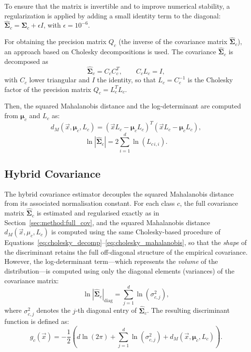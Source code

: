 To ensure that the matrix is invertible and to improve numerical stability, a regularization is applied by adding a small identity term to the diagonal: $\hat{\boldsymbol{\Sigma}}_c = \boldsymbol{\Sigma}_c + \epsilon I$, with $\epsilon = 10^{-6}$.

For obtaining the precision matrix $Q_c$ (the inverse of the covariance matrix $\hat{\boldsymbol{\Sigma}}_c$), an approach based on Cholesky decompositions is used. The covariance $\hat{\boldsymbol{\Sigma}}_c$ is decomposed as
\begin{equation}
	\hat{\boldsymbol{\Sigma}}_c = C_c C_c^T, \qquad C_c L_c = I,
	\label{eq:cholesky_decomp}
\end{equation}
with $C_c$ lower triangular and $I$ the identity, so that $L_c = C_c^{-1}$ is the Cholesky factor of the precision matrix $Q_c = L_c^T L_c$.

Then, the squared Mahalanobis distance and the log-determinant are computed from $\boldsymbol{\mu}_c$ and $L_c$ as:
\begin{equation}
	d_M(\vec{x}, \boldsymbol{\mu}_c, L_c) = (\vec{x} L_c - \boldsymbol{\mu}_c L_c)^T (\vec{x} L_c - \boldsymbol{\mu}_c L_c),
	\label{eq:cholesky_mahalanobis}
\end{equation}
\begin{equation}
	\ln |\hat{\boldsymbol{\Sigma}}_c| = 2 \sum_{i=1}^{d}{\ln(L_{c \, i,i})}.
	\label{eq:cholesky_logdet}
\end{equation}

\subsection{Hybrid Covariance}
\label{sec:method:hybrid_cov}

The hybrid covariance estimator decouples the squared Mahalanobis distance from its associated normalisation constant. For each class $c$, the full covariance matrix $\hat{\boldsymbol{\Sigma}}_c$ is estimated and regularised exactly as in Section~\ref{sec:method:full_cov}, and the squared Mahalanobis distance $d_M(\vec{x}, \mu_c, L_c)$ is computed using the same Cholesky-based procedure of Equations~\eqref{eq:cholesky_decomp}--\eqref{eq:cholesky_mahalanobis}, so that the \emph{shape} of the discriminant retains the full off-diagonal structure of the empirical covariance. However, the log-determinant term---which represents the \emph{volume} of the distribution---is computed using only the diagonal elements (variances) of the covariance matrix:
\begin{equation}
	\ln |\hat{\boldsymbol{\Sigma}}_c|_{\text{diag}} = \sum_{j=1}^{d} \ln(\sigma_{c,j}^2),
	\label{eq:hybrid_logdet}
\end{equation}
where $\sigma_{c,j}^2$ denotes the $j$-th diagonal entry of $\hat{\boldsymbol{\Sigma}}_c$. The resulting discriminant function is defined as:
\begin{equation}
	g_c(\vec{x}) = -\frac{1}{2} \left( d \ln(2\pi) + \sum_{j=1}^{d} \ln(\sigma_{c,j}^2) + d_M(\vec{x}, \boldsymbol{\mu}_c, L_c) \right).
	\label{eq:hybrid_discriminant}
\end{equation}

